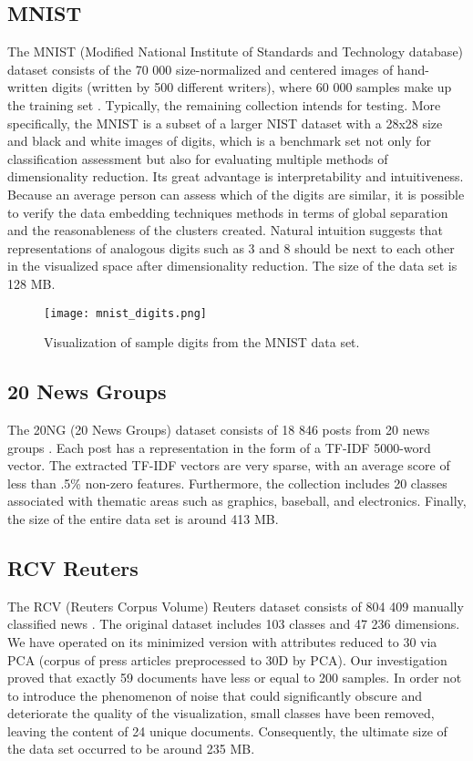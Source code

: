 \documentclass[12pt]{article}
\begin{document}
\subsection{MNIST}
The MNIST (Modified National Institute of Standards and Technology database) dataset consists of the 70 000 size-normalized and centered images of hand-written digits (written by 500 different writers), where 60 000 samples make up the training set \cite{mnist_description}. Typically, the remaining collection intends for testing. More specifically, the MNIST is a subset of a larger NIST dataset with a 28x28 size and black and white images of digits, which is a benchmark set not only for classification assessment but also for evaluating multiple methods of dimensionality reduction. Its great advantage is interpretability and intuitiveness. Because an average person can assess which of the digits are similar, it is possible to verify the data embedding techniques methods in terms of global separation and the reasonableness of the clusters created. Natural intuition suggests that representations of analogous digits such as 3 and 8 should be next to each other in the visualized space after dimensionality reduction. The size of the data set is 128 MB.

\begin{figure}[h]
    \centering
    \texttt{[image: mnist\_digits.png]}
    \caption{Visualization of sample digits from the MNIST data set.}
    \label{fig:mnist_digits_visualization}
\end{figure}

\subsection{20 News Groups}
The 20NG (20 News Groups) dataset consists of 18 846 posts from 20 news groups \cite{scikit_tng}. Each post has a representation in the form of a TF-IDF 5000-word vector. The extracted TF-IDF vectors are very sparse, with an average score of less than .5\% non-zero features. Furthermore, the collection includes 20 classes associated with thematic areas such as graphics, baseball, and electronics. Finally, the size of the entire data set is around 413 MB.

\subsection{RCV Reuters}
The RCV (Reuters Corpus Volume) Reuters dataset consists of 804 409 manually classified news \cite{rcv_description}. The original dataset includes 103 classes and 47 236 dimensions. We have operated on its minimized version with attributes reduced to 30 via PCA (corpus of press articles preprocessed to 30D by PCA). Our investigation proved that exactly 59 documents have less or equal to 200 samples. In order not to introduce the phenomenon of noise that could significantly obscure and deteriorate the quality of the visualization, small classes have been removed, leaving the content of 24 unique documents. Consequently, the ultimate size of the data set occurred to be around 235 MB.
\end{document}
